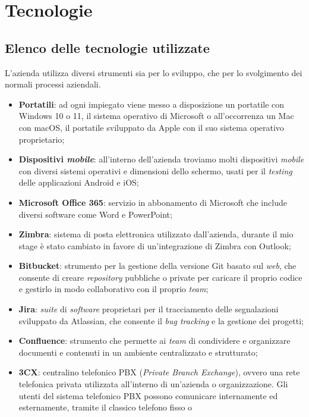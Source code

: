 \section{Tecnologie}\label{chap:Tecnologie}
\subsection{Elenco delle tecnologie utilizzate}
L'azienda utilizza diversi strumenti sia per lo sviluppo, che per lo svolgimento dei normali processi aziendali.
\begin{itemize}
    \item \textbf{Portatili}: ad ogni impiegato viene messo a disposizione un portatile con Windows 10 o 11, il sistema 
          operativo di Microsoft o all'occorrenza un Mac con macOS, il portatile sviluppato da Apple con il suo sistema operativo proprietario;
    \item \textbf{Dispositivi \textit{mobile}}: all'interno dell'azienda troviamo molti dispositivi \textit{mobile} con diversi sistemi operativi e dimensioni 
          dello schermo, usati per il \textit{testing} delle applicazioni Android e iOS;
    \item \textbf{Microsoft Office 365}: servizio in abbonamento di Microsoft che include diversi software come Word e PowerPoint;
    \item \textbf{Zimbra}: sistema di posta elettronica utilizzato dall'azienda, durante il mio stage è stato cambiato in favore di un'integrazione di Zimbra 
          con Outlook;
    \item \textbf{Bitbucket}: strumento per la gestione della versione Git basato sul \textit{web}, che consente di creare 
          \textit{repository} pubbliche o private per caricare il proprio codice e gestirlo in modo collaborativo con il proprio 
          \textit{team};
    \item \textbf{Jira}: \textit{suite} di \textit{software} proprietari per il tracciamento delle segnalazioni sviluppato
           da Atlassian, che consente il \textit{bug tracking} e la gestione dei progetti;
    \item \textbf{Confluence}: strumento che permette ai \textit{team} di condividere e organizzare documenti e contenuti 
          in un ambiente centralizzato e strutturato;
    \item \textbf{3CX}: centralino telefonico PBX (\textit{Private Branch Exchange}), ovvero una rete telefonica privata utilizzata all'interno di un'azienda 
          o organizzazione. Gli utenti del sistema telefonico PBX possono comunicare internamente ed esternamente, tramite il classico telefono fisso o 

\end{itemize}
